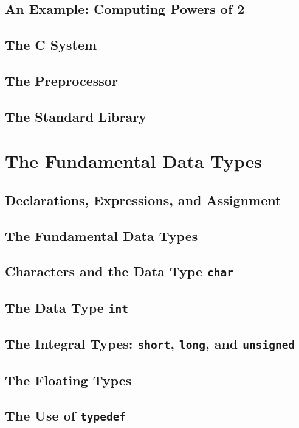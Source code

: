 \documentclass{article}
\begin{document}
\section{An Example: Computing Powers of 2} \label{sec:computing_powers_of_2}
\section{The C System} \label{sec:c_system}
\section{The Preprocessor} \label{sec:preprocessor}
\section{The Standard Library} \label{sec:standard_library}

\chapter{The Fundamental Data Types}

\section{Declarations, Expressions, and Assignment} \label{sec:declarations_expressions_assignment}
\section{The Fundamental Data Types} \label{sec:fundamental_data_types}
\section{Characters and the Data Type \texttt{char}} \label{sec:char_data_type}
\section{The Data Type \texttt{int}} \label{sec:int_data_type}
\section{The Integral Types: \texttt{short}, \texttt{long}, and \texttt{unsigned}} \label{sec:integral_types}
\section{The Floating Types} \label{sec:floating_types}
\section{The Use of \texttt{typedef}} \label{sec:use_of_typedef}
\end{document}

